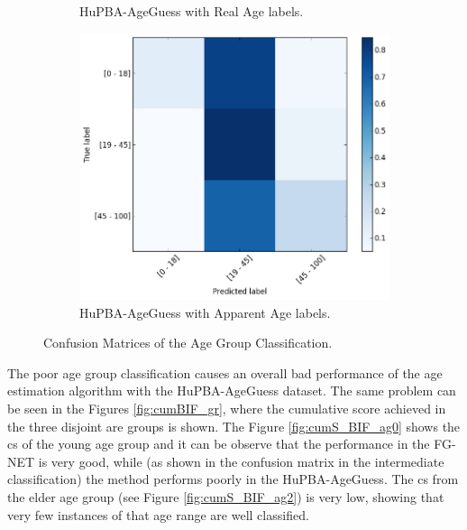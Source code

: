 \begin{figure}[!h]
\begin{subfigure}[b]{0.5\textwidth}
		\captionsetup{width=1.1\textwidth}
		\caption{HuPBA-AgeGuess with Real Age labels.}
		\label{fig:cmreal}
	\end{subfigure} %
	
	\vspace{0.5cm}
	\begin{subfigure}[b]{0.5\textwidth}
		\includegraphics[width=\textwidth]{figures/apparent_conf_mat}
		\caption{HuPBA-AgeGuess with Apparent Age labels.}
		\label{fig:cmapp}
	\end{subfigure}
	\caption{Confusion Matrices of the Age Group Classification.}\label{fig:cm}
\end{figure}

The poor age group classification causes an overall bad performance of the age estimation algorithm with the HuPBA-AgeGuess dataset. The same problem can be seen in the Figures \ref{fig:cumBIF_gr}, where the cumulative score achieved in the three disjoint are groups is shown. The Figure \ref{fig:cumS_BIF_ag0} shows the \gls{cs} of the young age group and it can be observe that the performance in the FG-NET is very good, while (as shown in the confusion matrix in the intermediate classification) the method performs poorly in the HuPBA-AgeGuess. The \gls{cs} from the elder age group (see Figure \ref{fig:cumS_BIF_ag2}) is very low, showing that very few instances of that age range are well classified. 


